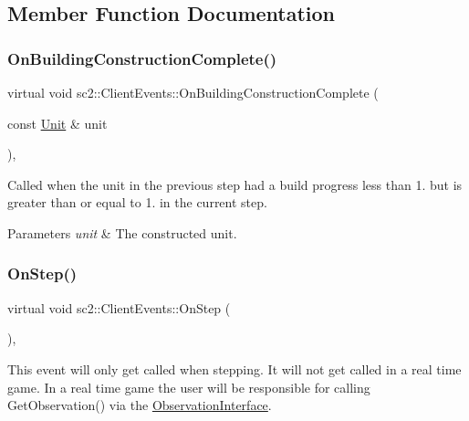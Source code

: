 \subsection{Member Function Documentation}
\mbox{\label{classsc2_1_1_client_events_a9bf081c662bf5e5e64598f8c05f9a309}} 
\subsubsection{\texorpdfstring{On\+Building\+Construction\+Complete()}{OnBuildingConstructionComplete()}}
{\footnotesize\ttfamily virtual void sc2\+::\+Client\+Events\+::\+On\+Building\+Construction\+Complete (\begin{DoxyParamCaption}\item[{const \hyperlink{classsc2_1_1_unit}{Unit} \&}]{unit }\end{DoxyParamCaption})\hspace{0.3cm}{\ttfamily [inline]}, {\ttfamily [virtual]}}

Called when the unit in the previous step had a build progress less than 1. but is greater than or equal to 1. in the current step. 
\begin{DoxyParams}{Parameters}
{\em unit} & The constructed unit. \\
\hline
\end{DoxyParams}
\mbox{\label{classsc2_1_1_client_events_a6f5839e220d2a5a19b30065e0b8290c4}} 
\subsubsection{\texorpdfstring{On\+Step()}{OnStep()}}
{\footnotesize\ttfamily virtual void sc2\+::\+Client\+Events\+::\+On\+Step (\begin{DoxyParamCaption}{ }\end{DoxyParamCaption})\hspace{0.3cm}{\ttfamily [inline]}, {\ttfamily [virtual]}}

This event will only get called when stepping. It will not get called in a real time game. In a real time game the user will be responsible for calling Get\+Observation() via the \hyperlink{classsc2_1_1_observation_interface}{Observation\+Interface}. \mbox{\label{classsc2_1_1_client_events_a2619e1734feeccd4f8412fd7447fe230}} 
